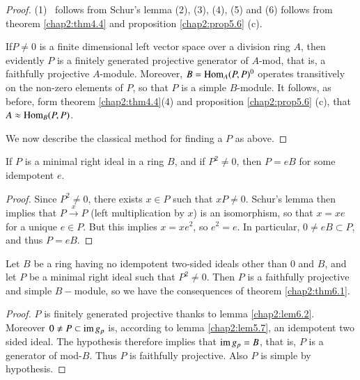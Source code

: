 \begin{proof}
(1)~ follows from Schur's lemma (2), (3), (4), (5) and (6) follows
  from theorem \ref{chap2:thm4.4} and proposition \ref{chap2:prop5.6} (c).  

If\pageoriginale $P \neq 0$ is a finite dimensional left vector space
over a division 
ring $A$, then evidently $P$ is a finitely generated projective
generator of $A$-mod, that is, a faithfully projective
$A$-module. Moreover, $B = \operatorname{Hom}_A(P,P)^0$ operates transitively on the
non-zero elements of $P$, so that $P$ is a simple $B$-module. It
follows, as before, form theorem \ref{chap2:thm4.4}(4) and proposition
\ref{chap2:prop5.6} (c), that $A \approx \operatorname{Hom}_B(P, P) $.   

We now describe the classical method for finding a $P$ as above. 
\end{proof}

\setcounter{lemma}{1}
\begin{lemma}\label{chap2:lem6.2}%
 If $P$ is a minimal right ideal in a ring $B$, and if $P^2 \neq 0$,
 then $P=eB$ for some idempotent $e$.  
\end{lemma}

\begin{proof}
Since $P^2 \neq 0$, there exists $x \in P$ such that $xP \neq
0$. Schur's lemma then implies that $P \xrightarrow{x} P$ (left
multiplication by $x$) is an isomorphism, so that $x = xe$ for a
unique $e \in P$. But this implies $x = xe^2$, so $e^2 = e$. In
particular, $0 \neq eB \subset P$, and thus $P = eB$. 
\end{proof}

\setcounter{prop}{2}
\begin{prop} %
Let $B$ be a ring having no idempotent two-sided ideals other than
0 and $B$, and let $P$ be a minimal right ideal such that $P^2 \neq
0$. Then $P$ is a faithfully projective and simple $B-$module, so we
have the consequences of theorem \ref{chap2:thm6.1}. 
\end{prop}

\begin{proof}
$P$ is finitely generated projective thanks to lemma
  \ref{chap2:lem6.2}. Moreover $0 
  \neq P \subset \operatorname{im} g_p$ is, according to lemma \ref{chap2:lem5.7},
  an idempotent two 
  sided ideal. The hypothesis therefore implies that $\operatorname{im} g_p = B$,
  that is, $P$ is a generator of mod-$B$. Thus $P$ is faithfully
  projective. Also $P$ is simple by hypothesis. 
\end{proof}

